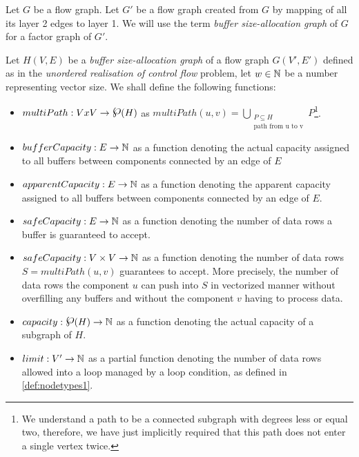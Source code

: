  Let $G$ be a flow graph. Let $G'$ be a flow graph created from $G$ by mapping of all its layer 2 edges to layer 1.
      We will use the term \emph{buffer size-allocation graph} of $G$ for a factor graph of $G'$.
\myenddef


      Let $H(V,E)$ be a \emph{buffer size-allocation graph} of a flow graph $G(V',E')$ defined as in the \emph{unordered realisation of control flow} problem, let $w \in \mathbb{N}$ be a number representing vector size. We shall define the following functions:
  \begin{itemize}
    \item $multiPath: V x V \arrow \powerset (H)$ as $multiPath(u,v) = \bigcup_{\substack{P \subseteq H \\ \text{path from u to v}}} P$\footnote{We understand a path to be a connected subgraph with degrees less or equal two, therefore, we have just implicitly required that this path does not enter a single vertex twice.}.
    \item $bufferCapacity: E \rightarrow \mathbb{N}$ as a function denoting the actual capacity assigned to all buffers between components connected by an edge of $E$ 
    \item $apparentCapacity: E \rightarrow \mathbb{N}$ as a function denoting the apparent capacity assigned to all buffers between components connected by an edge of $E$.
    \item $safeCapacity: E \rightarrow \mathbb{N}$ as a function denoting the number of data rows a buffer is guaranteed to accept.
    \item $safeCapacity: V \times V \rightarrow \mathbb{N}$ as a function denoting the number of data rows $S = multiPath(u,v)$ guarantees to accept. More precisely, the number of data rows the component $u$ can push into $S$ in vectorized manner without overfilling any buffers and without the component $v$ having to process data. 
    \item $capacity: \powerset(H) \arrow \N$ as a function denoting the actual capacity of a subgraph of $H$.
    \item $limit: V' \rightarrow \mathbb{N}$ as a partial function denoting the number of data rows allowed into a loop managed by a loop condition, as defined in \ref{def:nodetypes1}.
  \end{itemize}



